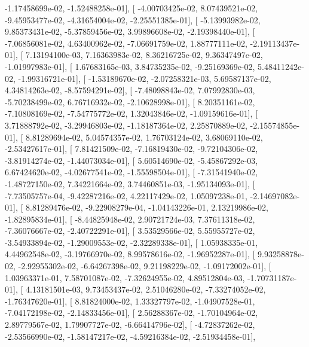 \documentclass{article}
\begin{document}
         -1.17458699e-02,  -1.52488258e-01],
       [ -4.00703425e-02,   8.07439521e-02,  -9.45953477e-02,
         -4.31654004e-02,  -2.25551385e-01],
       [ -5.13993982e-02,   9.85373431e-02,  -5.37859456e-02,
          3.99896608e-02,  -2.19398440e-01],
       [ -7.06856081e-02,   4.63400962e-02,  -7.06691759e-02,
          1.88777111e-02,  -2.19113437e-01],
       [  7.13194100e-03,   7.16363983e-02,   8.36216725e-02,
          9.36347497e-02,  -1.01997983e-01],
       [  1.67683165e-03,   3.84735235e-02,  -9.25169369e-02,
          5.48411242e-02,  -1.99316721e-01],
       [ -1.53189670e-02,  -2.07258321e-03,   5.69587137e-02,
          4.34814263e-02,  -8.57594291e-02],
       [ -7.48098843e-02,   7.07992830e-03,  -5.70238499e-02,
          6.76716932e-02,  -2.10628998e-01],
       [  8.20351161e-02,  -7.10808169e-02,  -7.54775772e-02,
          1.32043846e-02,  -1.09159616e-01],
       [  3.71888792e-02,  -3.29946803e-02,  -1.18187364e-02,
          2.25870889e-02,  -2.15574855e-01],
       [  8.81289694e-02,   5.04574357e-02,   1.76703124e-02,
          3.68069110e-02,  -2.53427617e-01],
       [  7.81421509e-02,  -7.16819430e-02,  -9.72104306e-02,
         -3.81914274e-02,  -1.44073034e-01],
       [  5.60514690e-02,  -5.45867292e-03,   6.67424620e-02,
         -4.02677541e-02,  -1.55598504e-01],
       [ -7.31541940e-02,  -1.48727150e-02,   7.34221664e-02,
          3.74460851e-03,  -1.95134093e-01],
       [ -7.73505757e-04,  -9.42287216e-02,   4.22117429e-02,
          1.05097238e-01,  -2.14697082e-01],
       [  8.81289476e-02,  -9.22908279e-04,  -1.04143226e-01,
          2.13219986e-02,  -1.82895834e-01],
       [ -8.44825948e-02,   2.90721724e-03,   7.37611318e-02,
         -7.36076667e-02,  -2.40722291e-01],
       [  3.53529566e-02,   5.55955727e-02,  -3.54933894e-02,
         -1.29009553e-02,  -2.32289338e-01],
       [  1.05938335e-01,   4.44962548e-02,  -3.19766970e-02,
          8.99578616e-02,  -1.96952287e-01],
       [  9.93258878e-02,  -2.92955302e-02,  -6.64267398e-02,
          9.21198229e-02,  -1.09172002e-01],
       [  1.03963371e-01,   7.58701087e-02,  -7.32624955e-02,
          4.89512804e-03,  -1.70731187e-01],
       [  4.13181501e-03,   9.73453437e-02,   2.51046280e-02,
         -7.33274052e-02,  -1.76347620e-01],
       [  8.81824000e-02,   1.33327797e-02,  -1.04907528e-01,
         -7.04172198e-02,  -2.14833456e-01],
       [  2.56288367e-02,  -1.70104964e-02,   2.89779567e-02,
          1.79907727e-02,  -6.66414796e-02],
       [ -4.72837262e-02,  -2.53566990e-02,  -1.58147217e-02,
         -4.59216384e-02,  -2.51934458e-01],
\end{document}
